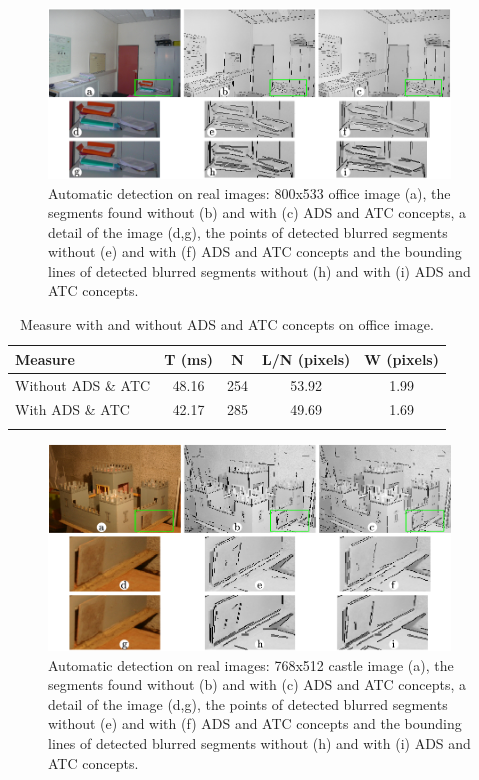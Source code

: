 \documentclass[11pt]{article}
\begin{document}
\pagebreak


\begin{figure}
  \begin{center}
  \includegraphics[width=0.95\textwidth]{Images/expe1.png}
  \end{center}
  \caption{Automatic detection on real images: 800x533 office image (a), the segments found without (b) and with (c) ADS and ATC concepts, a detail of the image (d,g), the points of detected blurred segments without (e) and with (f) ADS and ATC concepts and the bounding lines of detected blurred segments without (h) and with (i) ADS and ATC concepts.}
  \label{fig:office}
\end{figure}



\begin{longtable}[]{@{}l|cccc@{}}
\toprule
Measure & T (ms) & N & L/N (pixels) & W (pixels)\tabularnewline
\midrule 
Without ADS \& ATC & 48.16 & 254 & 53.92 & 1.99\tabularnewline
With ADS \& ATC & 42.17 & 285 & 49.69 & 1.69\tabularnewline
\bottomrule
\caption{Measure with and without ADS and ATC concepts on office
image.}
\label{tab:office}
\end{longtable}



\pagebreak


\begin{figure}
  \begin{center}
  \includegraphics[width=0.95\textwidth]{Images/expe2.png}
  \end{center}
  \caption{Automatic detection on real images: 768x512 castle image (a), the segments found without (b) and with (c) ADS and ATC concepts, a detail of the image (d,g), the points of detected blurred segments without (e) and with (f) ADS and ATC concepts and the bounding lines of detected blurred segments without (h) and with (i) ADS and ATC concepts.}
\label{fig:castle}
\end{figure}
\end{document}
